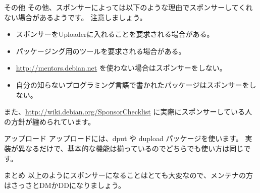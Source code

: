 \begin{frame}{その他}
その他、スポンサーによっては以下のような理由でスポンサーしてくれない場合があるようです。
注意しましょう。

\begin{itemize}

\item スポンサーをUploaderに入れることを要求される場合がある。
\item パッケージング用のツールを要求される場合がある。
\item \url{http://mentors.debian.net} を使わない場合はスポンサーをしない。
\item 自分の知らないプログラミング言語で書かれたパッケージはスポンサーをしない。

\end{itemize}
\end{frame}

\begin{frame}

また、\url{http://wiki.debian.org/SponsorChecklist}
に実際にスポンサーしている人の方針が纏められています。
\end{frame}

\begin{frame}{アップロード}
アップロードには、dput や dupload パッケージを使います。
実装が異なるだけで、基本的な機能は揃っているのでどちらでも使い方は同じです。
\end{frame}

\begin{frame}{まとめ}
以上のようにスポンサーになることはとても大変なので、メンテナの方はさっさとDMかDDになりましょう。
\end{frame}



